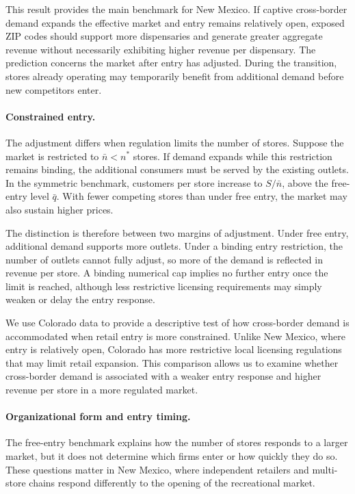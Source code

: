 \documentclass[english,12pt]{article}
\begin{document}
This result provides the main benchmark for New Mexico. If captive cross-border demand expands the effective market and entry remains relatively open, exposed ZIP codes should support more dispensaries and generate greater aggregate revenue without necessarily exhibiting higher revenue per dispensary. The prediction concerns the market after entry has adjusted. During the transition, stores already operating may temporarily benefit from additional demand before new competitors enter.


\paragraph{Constrained entry.}
The adjustment differs when regulation limits the number of stores. Suppose the market is restricted to $\bar n<n^\ast$ stores. If demand expands while this restriction remains binding, the additional consumers must be served by the existing outlets. In the symmetric benchmark, customers per store increase to $S/\bar n$, above the free-entry level $\bar q$. With fewer competing stores than under free entry, the market may also sustain higher prices.

The distinction is therefore between two margins of adjustment. Under free entry, additional demand supports more outlets. Under a binding entry restriction, the number of outlets cannot fully adjust, so more of the demand is reflected in revenue per store. A binding numerical cap implies no further entry once the limit is reached, although less restrictive licensing requirements may simply weaken or delay the entry response.

We use Colorado data to provide a descriptive test of how cross-border demand is accommodated when retail entry is more constrained. Unlike New Mexico, where entry is relatively open, Colorado has more restrictive local licensing regulations that may limit retail expansion. This comparison allows us to examine whether cross-border demand is associated with a weaker entry response and higher revenue per store in a more regulated market.

\paragraph{Organizational form and entry timing.}
The free-entry benchmark explains how the number of stores responds to a larger market, but it does not determine which firms enter or how quickly they do so. These questions matter in New Mexico, where independent retailers and multi-store chains respond differently to the opening of the recreational market.
\end{document}
